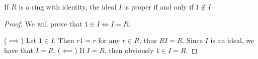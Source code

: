 \begin{proposition}\label{thm:proper_ideals_containing_identity}
  If $R$ is a ring with identity, the ideal $I$ is proper if and only if $1 \not\in I$.
\end{proposition}
\begin{proof}
  We will prove that $1 \in I \iff I = R$.

  ($\implies$) Let $1 \in I$. Then $r1 = r$ for any $r \in R$, thus $RI = R$. Since $I$ is an ideal, we have that $I = R$.
  ($\impliedby$) If $I = R$, then obviously $1 \in I = R$.
\end{proof}
